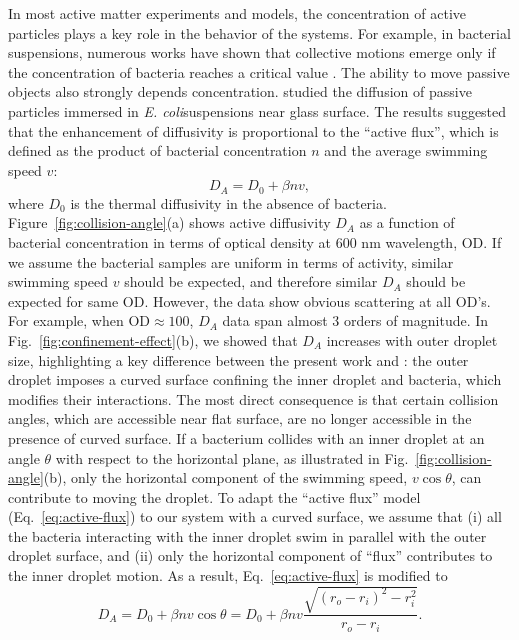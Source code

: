 \documentclass[%
10pt,
superscriptaddress,
twocolumn,
 amsmath,amssymb,
 aps,prx,
]{revtex4-2}
\newcommand{\ecoli}[0]{\textit{E. coli}} %
\begin{document}
In most active matter experiments and models, the concentration of active particles plays a key role in the behavior of the systems. 
For example, in bacterial suspensions, numerous works have shown that collective motions emerge only if the concentration of bacteria reaches a critical value \cite{Gachelin2014, Peng2021, Liu2021}.
The ability to move passive objects also strongly depends concentration.  
\citet{Mino2011} studied the diffusion of passive particles immersed in \ecoli suspensions near glass surface. 
The results suggested that the enhancement of diffusivity is proportional to the ``active flux'', which is defined as the product of bacterial concentration $n$ and the average swimming speed $v$:
%
\begin{equation}
	\label{eq:active-flux}
	D_A = D_0 + \beta n v ,
\end{equation}
%
where $D_0$ is the thermal diffusivity in the absence of bacteria.
Figure~\ref{fig:collision-angle}(a) shows active diffusivity $D_A$ as a function of bacterial concentration in terms of optical density at 600 nm wavelength, OD.
If we assume the bacterial samples are uniform in terms of activity, similar swimming speed $v$ should be expected, and therefore similar $D_A$ should be expected for same OD. 
However, the data show obvious scattering at all OD's.
For example, when OD$\approx 100$, $D_A$ data span almost 3 orders of magnitude. 
In Fig.~\ref{fig:confinement-effect}(b), we showed that $D_A$ increases with outer droplet size, highlighting a key difference between the present work and \citet{Mino2011}: the outer droplet imposes a curved surface confining the inner droplet and bacteria, which modifies their interactions. 
The most direct consequence is that certain collision angles, which are accessible near flat surface, are no longer accessible in the presence of curved surface.
If a bacterium collides with an inner droplet at an angle $\theta$ with respect to the horizontal plane, as illustrated in Fig.~\ref{fig:collision-angle}(b), only the horizontal component of the swimming speed, $v\cos\theta$, can contribute to moving the droplet. 
To adapt the ``active flux'' model (Eq.~\ref{eq:active-flux}) to our system with a curved surface, we assume that (i) all the bacteria interacting with the inner droplet swim in parallel with the outer droplet surface, and (ii) only the horizontal component of ``flux'' contributes to the inner droplet motion. As a result, Eq.~\ref{eq:active-flux} is modified to
%
\begin{equation}
  \label{eq:active-flux-angle}
  D_A = D_0 + \beta n v \cos\theta = D_0 + \beta n v \frac{\sqrt{(r_o-r_i)^2-r_i^2}}{r_o-r_i}.
\end{equation}
\end{document}
